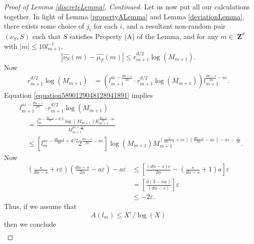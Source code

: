 \documentclass[12pt,reqno]{article}
\DeclareMathOperator{\ZZ}{\mathbf{Z}}
\begin{document}
\begin{proof}[Proof of Lemma \ref{discreteLemma}, Continued]
    Let us now put all our calculations together. In light of Lemma \ref{propertyALemma} and Lemma \ref{deviationLemma}, there exists some choice of $j_i$ for each $i$, and a resultant non-random pair $(\nu_S, S)$ such that $S$ satisfies Property (A) of the Lemma, and for any $m \in \ZZ^d$ with $|m| \leq 10 l_{m+1}^{-1}$,
    \begin{equation} \label{equation129419024129}
        |\widehat{\nu_{S}}(m) - \widehat{\mu_T}(m)| \leq r_{m+1}^{d/2} \log(M_{m+1}).
    \end{equation}
    Now
    \begin{align*}
        r_{m+1}^{d/2} \log(M_{m+1}) &= \left( l_{m+1}^{a\varepsilon - \frac{dn-s}{2n}} \cdot r_{m+1}^{d/2} \log(M_{m+1}) \right) l_{m+1}^{\frac{dn - s}{2n} - a \varepsilon}.
    \end{align*}
    Equation \eqref{equation5890129048128941891} implies
    \begin{align*}
        &l_{m+1}^{a\varepsilon - \frac{dn-s}{2n}} \cdot r_{m+1}^{d/2} \log(M_{m+1})\\
        &\ \ \ \ \ = \frac{l_m^{a\varepsilon - \frac{dn-s}{2n} + d/2} \log(M_{m+1}) K_{m+1}^{\frac{dn-s}{2n} - a\varepsilon}}{M_{m+1}^{a\varepsilon + \frac{s}{2n}}}\\
        &\ \ \ \ \ \leq \left[ l_m^{a\varepsilon - \frac{dn-s}{2n} + d/2} 2^{\frac{dn-s}{2n} - a \varepsilon} \right] \log(M_{m+1}) M_{m+1}^{\left( \frac{s}{dn-s} + c\varepsilon \right)\left(\frac{dn-s}{2n} - a\varepsilon\right) - a\varepsilon - \frac{s}{2n}}.
    \end{align*}
    Now
    \begin{align*}
        \left( \frac{s}{dn - s} + c\varepsilon \right) \left( \frac{dn - s}{2n} - a\varepsilon \right) - a\varepsilon &\leq \left[ \frac{(dn-s)c}{2n} - \left( \frac{s}{dn-s}+1 \right)a \right] \varepsilon\\
        &= \left[ \frac{d(3 - na)}{(dn - s)} \right] \varepsilon\\
        &\leq -2 \varepsilon.
    \end{align*}
    Thus, if we assume that
    \begin{equation} \label{equation1290412904129049102}
        A(l_m) \leq X^\varepsilon / \log(X)
    \end{equation}
    then we conclude
    \begin{align*}

\end{align*}
\end{proof}
\end{document}
